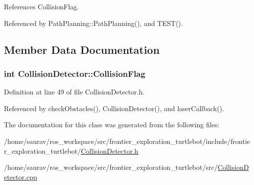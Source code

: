 References Collision\+Flag.



Referenced by Path\+Planning\+::\+Path\+Planning(), and T\+E\+S\+T().



\subsection{Member Data Documentation}
\subsubsection[{\texorpdfstring{Collision\+Flag}{CollisionFlag}}]{\setlength{\rightskip}{0pt plus 5cm}int Collision\+Detector\+::\+Collision\+Flag\hspace{0.3cm}{\ttfamily [private]}}\hypertarget{classCollisionDetector_a9222efa13cfe6db4d1bbbc57e18a9d1e}{}\label{classCollisionDetector_a9222efa13cfe6db4d1bbbc57e18a9d1e}


Definition at line 49 of file Collision\+Detector.\+h.



Referenced by check\+Obstacles(), Collision\+Detector(), and laser\+Callback().



The documentation for this class was generated from the following files\+:\begin{DoxyCompactItemize}
\item 
/home/saurav/ros\+\_\+workspace/src/frontier\+\_\+exploration\+\_\+turtlebot/include/frontier\+\_\+exploration\+\_\+turtlebot/\hyperlink{CollisionDetector_8h}{Collision\+Detector.\+h}\item 
/home/saurav/ros\+\_\+workspace/src/frontier\+\_\+exploration\+\_\+turtlebot/src/\hyperlink{CollisionDetector_8cpp}{Collision\+Detector.\+cpp}\end{DoxyCompactItemize}
